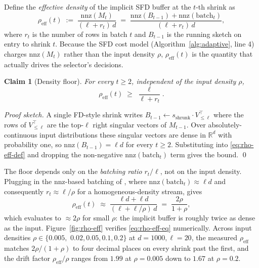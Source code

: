 \documentclass[11pt]{article}
\newtheorem{claim}{Claim}
\begin{document}
Define the \emph{effective density} of the implicit SFD buffer at the $t$-th
shrink as
\begin{equation}
\label{eq:rho-eff-def}
  \rho_{\mathrm{eff}}(t) \;:=\; \frac{\mathrm{nnz}(M_t)}{(\ell + r_t)\,d}
  \;=\; \frac{\mathrm{nnz}(B_{t-1}) + \mathrm{nnz}(\mathrm{batch}_t)}{(\ell + r_t)\,d},
\end{equation}
where $r_t$ is the number of rows in batch $t$ and $B_{t-1}$ is the running
sketch on entry to shrink $t$. Because the SFD cost model
(Algorithm~\ref{alg:adaptive}, line 4) charges $\mathrm{nnz}(M_t)$ rather
than the input density $\rho$, $\rho_{\mathrm{eff}}(t)$ is the quantity that
actually drives the selector's decisions.

\begin{claim}[Density floor]
\label{claim:floor}
For every $t \ge 2$, independent of the input density $\rho$,
\[
  \rho_{\mathrm{eff}}(t) \;\ge\; \frac{\ell}{\ell + r_t}.
\]
\end{claim}

\noindent\emph{Proof sketch.} A single FD-style shrink writes
$B_{t-1} \leftarrow s_{\mathrm{shrunk}} \cdot V_{\le \ell}^\top$ where the
rows of $V_{\le \ell}^\top$ are the top-$\ell$ right singular vectors of
$M_{t-1}$. Over absolutely-continuous input distributions these singular
vectors are dense in $\mathbb{R}^d$ with probability one, so
$\mathrm{nnz}(B_{t-1}) = \ell d$ for every $t \ge 2$. Substituting into
\eqref{eq:rho-eff-def} and dropping the non-negative
$\mathrm{nnz}(\mathrm{batch}_t)$ term gives the bound. \qed

The floor depends only on the \emph{batching ratio} $r_t / \ell$, not on
the input density. Plugging in the nnz-based batching of \cite{ghashami2016sfd},
where $\mathrm{nnz}(\mathrm{batch}_t) \approx \ell d$ and consequently
$r_t \approx \ell / \rho$ for a homogeneous-density stream, gives
\begin{equation}
\label{eq:rho-eff-eq}
  \rho_{\mathrm{eff}}(t) \;\approx\; \frac{\ell d + \ell d}{(\ell + \ell/\rho)\,d}
  \;=\; \frac{2\rho}{1 + \rho},
\end{equation}
which evaluates to $\approx 2\rho$ for small $\rho$: the implicit buffer is
roughly twice as dense as the input. Figure~\ref{fig:rho-eff} verifies
\eqref{eq:rho-eff-eq} numerically. Across input densities $\rho \in
\{0.005,$ $0.02, 0.05, 0.1, 0.2\}$ at $d = 1000, \ell = 20$, the measured
$\rho_{\mathrm{eff}}$ matches $2\rho/(1+\rho)$ to four decimal places on
every shrink past the first, and the drift factor $\rho_{\mathrm{eff}}/\rho$
ranges from $1.99$ at $\rho = 0.005$ down to $1.67$ at $\rho = 0.2$.
\end{document}
